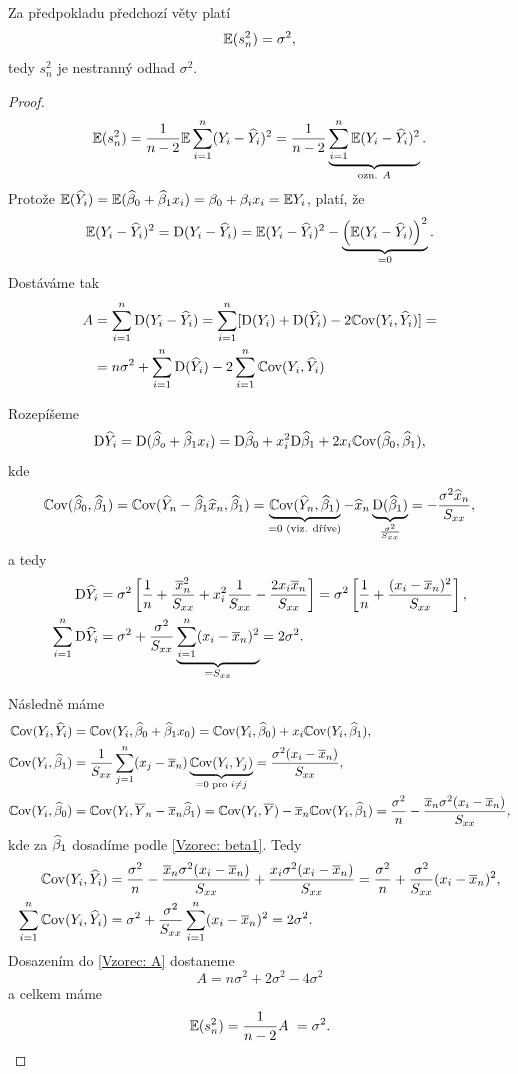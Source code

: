 \begin{theorem}
	Za předpokladu předchozí věty platí
	 $$
		\mathbb{E} (s_n^2) = \sigma^2,
	 $$
	tedy $s_n^2$ je nestranný odhad $\sigma^2$.
\end{theorem}


\begin{proof}
	 $$
		\mathbb{E}(s_n^2) = \frac{1}{n-2} \mathbb{E} \sum\limits_{i=1}^{n} (Y_i - \widehat{Y}_i)^2 = \frac{1}{n-2} \underbrace{\sum\limits_{i=1}^{n} \mathbb{E} (Y_i - \widehat{Y}_i)^2}_{\text{ozn. } A}.
	 $$
	Protože $\mathbb{E}(\widehat{Y}_i) = \mathbb{E}(\widehat{\beta}_0 + \widehat{\beta}_1 x_i) = \beta_0 + \beta_i x_i = \mathbb{E} Y_i$, platí, že
	 $$
	\mathbb{E}(Y_i - \widehat{Y}_i)^2 = \mathrm{D}(Y_i - \widehat{Y}_i) = \mathbb{E} (Y_i - \widehat{Y}_i)^2 - \underbrace{\left(\mathbb{E}(Y_i - \widehat{Y}_i)\right)^2}_{ = 0}.
	 $$
	Dostáváme tak	
	\begin{align}
		A & = \sum\limits_{i=1}^{n} \mathrm{D}(Y_i - \widehat{Y}_i) = \sum\limits_{i=1}^{n} [\mathrm{D}(Y_i) + \mathrm{D}(\widehat{Y}_i) - 2 \mathbb{C}\mathrm{ov}(Y_i, \widehat{Y}_i)] = \notag \\
		& = n \sigma^2 + \sum\limits_{i=1}^{n} \mathrm{D}(\widehat{Y}_i) - 2 \sum\limits_{i=1}^{n} \mathbb{C}\mathrm{ov}(Y_i, \widehat{Y}_i) \label{Vzorec: A}
	\end{align}
	
	Rozepíšeme
	 $$
		\mathrm{D} \widehat{Y}_i = \mathrm{D}(\widehat{\beta}_o + \widehat{\beta}_1 x_i) = \mathrm{D} \widehat{\beta}_0 + x_i^2 \mathrm{D} \widehat{\beta}_1 + 2 x_i \mathbb{C}\mathrm{ov} (\widehat{\beta}_0,\widehat{\beta}_1),
	 $$
	kde
	 $$
		\mathbb{C}\mathrm{ov}(\widehat{\beta}_0, \widehat{\beta}_1) = \mathbb{C}\mathrm{ov}(\widehat{Y}_n - \widehat{\beta}_1 \widehat{x}_n, \widehat{\beta}_1) = \underbrace{\mathbb{C}\mathrm{ov}(\widehat{Y}_n, \widehat{\beta}_1)}_{ = 0 \text{ (viz. dříve)}} - \widehat{x}_n \underbrace{\mathrm{D}(\widehat{\beta}_1)}_{\frac{\sigma^2}{S_{xx}}} = -\frac{\sigma^2 \widehat{x}_n}{S_{xx}},
	 $$
	a tedy
	\begin{align*}
		\mathrm{D} \widehat{Y}_i & = \sigma^2 \left[\frac{1}{n} + \frac{\overline{x}_n^2}{S_{xx}} + x_i^2 \frac{1}{S_{xx}} - \frac{2 x_i \overline{x}_n}{S_{xx}} \right] = \sigma^2 \left[\frac{1}{n} + \frac{(x_i - \overline{x}_n)^2}{S_{xx}}\right], \\
		\sum\limits_{i=1}^{n} \mathrm{D} \widehat{Y}_i & = \sigma^2 + \frac{\sigma^2}{S_{xx}} \underbrace{\sum\limits_{i=1}^{n} (x_i - \overline{x}_n)^2}_{ = S_{xx}} = 2\sigma^2.
	\end{align*}
	
	Následně máme
	\begin{align*}
	\mathbb{C}\mathrm{ov}(Y_i, \widehat{Y}_i) & = \mathbb{C}\mathrm{ov}(Y_i, \widehat{\beta}_0 + \widehat{\beta}_1 x_0) = \mathbb{C}\mathrm{ov}(Y_i, \widehat{\beta}_0) + x_i \mathbb{C}\mathrm{ov}(Y_i, \widehat{\beta}_1), \\
	\mathbb{C}\mathrm{ov}(Y_i, \widehat{\beta}_1) & = \frac{1}{S_{xx}} \sum\limits_{j=1}^{n} (x_j - \overline{x}_n) \underbrace{\mathbb{C}\mathrm{ov}(Y_i, Y_j)}_{ = 0 \text{ pro~} i\neq j} = \frac{\sigma^2(x_i - \overline{x}_n)}{S_{xx}}, \\
	\mathbb{C}\mathrm{ov}(Y_i, \widehat{\beta}_0) & = \mathbb{C}\mathrm{ov}(Y_i, \overline{Y}_n - \overline{x}_n \widehat{\beta}_1) = \mathbb{C}\mathrm{ov}(Y_i, \overline{Y}) - \overline{x}_n \mathbb{C}\mathrm{ov}(Y_i, \widehat{\beta}_1) = \frac{\sigma^2}{n} - \frac{\overline{x}_n \sigma^2 (x_i - \overline{x}_n)}{S_{xx}}, 
	\end{align*}
	kde za $\widehat{\beta}_1$ dosadíme podle \eqref{Vzorec: beta1}. Tedy
	\begin{align*}
		\mathbb{C}\mathrm{ov}(Y_i, \widehat{Y}_i) & = \frac{\sigma^2}{n} - \frac{\overline{x}_n \sigma^2 (x_i - \overline{x}_n)}{S_{xx}} + \frac{x_i \sigma^2 (x_i - \overline{x}_n)}{S_{xx}} = \frac{\sigma^2}{n} + \frac{\sigma^2}{S_{xx}}(x_i - \overline{x}_n)^2, \\
		\sum\limits_{i=1}^{n} \mathbb{C}\mathrm{ov}(Y_i, \widehat{Y}_i) & = \sigma^2 + \frac{\sigma^2}{S_{xx}} \sum\limits_{i=1}^{n} (x_i - \overline{x}_n)^2 = 2 \sigma^2. 
	\end{align*}
	Dosazením do \eqref{Vzorec: A} dostaneme
	 $$
		A = n\sigma^2 + 2\sigma^2 - 4\sigma^2
	 $$
	a celkem máme
	 $$
		\mathbb{E}(s_n^2) = \frac{1}{n-2} A~ = \sigma^2.
	 $$
\end{proof}

